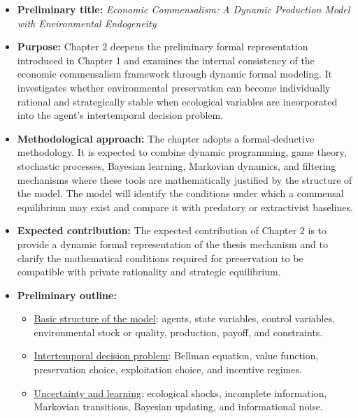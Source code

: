 \begin{itemize}

    \item \textbf{Preliminary title:} \emph{Economic Commensalism: A Dynamic Production Model with Environmental Endogeneity}

    \item \textbf{Purpose:} Chapter 2 deepens the preliminary formal representation introduced in Chapter 1 and examines the internal consistency of the economic commensalism framework through dynamic formal modeling. It investigates whether environmental preservation can become individually rational and strategically stable when ecological variables are incorporated into the agent's intertemporal decision problem.

    \item \textbf{Methodological approach:} The chapter adopts a formal-deductive methodology. It is expected to combine dynamic programming, game theory, stochastic processes, Bayesian learning, Markovian dynamics, and filtering mechanisms where these tools are mathematically justified by the structure of the model. The model will identify the conditions under which a commensal equilibrium may exist and compare it with predatory or extractivist baselines.

    \item \textbf{Expected contribution:} The expected contribution of Chapter 2 is to provide a dynamic formal representation of the thesis mechanism and to clarify the mathematical conditions required for preservation to be compatible with private rationality and strategic equilibrium.

    \item \textbf{Preliminary outline:}

    \begin{itemize}

        \item[i.] \underline{Basic structure of the model}: agents, state variables, control variables, environmental stock or quality, production, payoff, and constraints.

        \item[ii.] \underline{Intertemporal decision problem}: Bellman equation, value function, preservation choice, exploitation choice, and incentive regimes.

        \item[iii.] \underline{Uncertainty and learning}: ecological shocks, incomplete information, Markovian transitions, Bayesian updating, and informational noise.


\end{itemize}
\end{itemize}
